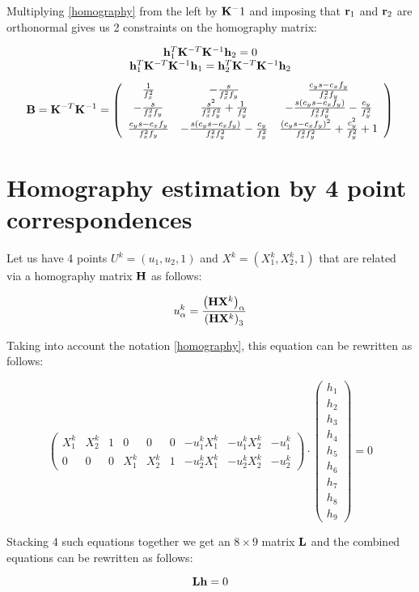 \documentclass[a4paper,10pt]{article}
\begin{document}
Multiplying \eqref{homography} from the left by ${\bf K}^-1$ and imposing that ${\bf r}_1$ and ${\bf r}_2$ are orthonormal gives us 2 constraints on the homography matrix:

{
\begin{equation}
\begin{array}{c}
 {\bf h}_1^T {\bf K}^{-T} {\bf K}^{-1}{\bf h}_2 = 0 \\
 {\bf h}_1^T {\bf K}^{-T} {\bf K}^{-1}{\bf h}_1 = {\bf h}_2^T {\bf K}^{-T} {\bf K}^{-1}{\bf h}_2
\end{array} 
\end{equation}
}
{
\begin{equation}
 {\bf B} = {\bf K}^{-T} {\bf K}^{-1} = \left(
 \begin{array}{ccc}
 \frac{1}{f_x^2} & -\frac{s}{f_x^2 f_y} & \frac{c_y s - c_x f_y}{f_x^2f_y}\\
 -\frac{s}{f_x^2 f_y} & \frac{s^2}{f_x^2f_y^2} + \frac{1}{f_y^2} & -\frac{s(c_y s - c_x f_y)}{f_x^2 f_y^2} - \frac{c_y}{f_y^2} \\
 \frac{c_y s - c_x f_y}{f_x^2 f_y} & - \frac{s(c_y s - c_x f_y)}{f_x^2 f_y^2} - \frac{c_y}{f_y^2} & \frac{(c_y s - c_x f_y)^2}{f_x^2 f_y^2} + \frac{c_y^2}{f_y^2} + 1
 \end{array}
\right)
\end{equation}
}

\section{Homography estimation by 4 point correspondences}

Let us have 4 points $U^k=(u_1, u_2, 1)$ and $X^k = (X_1^k, X_2^k, 1)$ that are related via a homography matrix ${\bf H}$ as follows:

\begin{equation}
 u_\alpha^k = \frac{\left({\bf H}{\bf X}^k\right)_\alpha}{\left({\bf H}{\bf X}^k\right)_3}
\end{equation}

Taking into account the notation \eqref{homography}, this equation can be rewritten as follows:

\begin{equation}
 \left(\begin{array}{ccccccccc}
        X^k_1 & X^k_2 & 1 & 0 & 0 & 0 & -u^k_1 X^k_1 & - u^k_1 X^k_2 & -u^k_1\\
        0 & 0 & 0 & X^k_1 & X^k_2 & 1 & -u^k_2 X^k_1 & -u^k_2 X^k_2 & -u^k_2
       \end{array}
\right)\cdot\left(\begin{array}{c}
                              h_1 \\h_2\\h_3\\h_4\\h_5\\h_6\\h_7\\h_8\\h_9
                             \end{array}
\right) = 0
\end{equation}

Stacking 4 such equations together we get an $8\times 9$ matrix ${\bf L}$ and the combined equations can be rewritten as follows:

\begin{equation}
 {\bf L}{\bf h} = 0
\end{equation}
\end{document}
